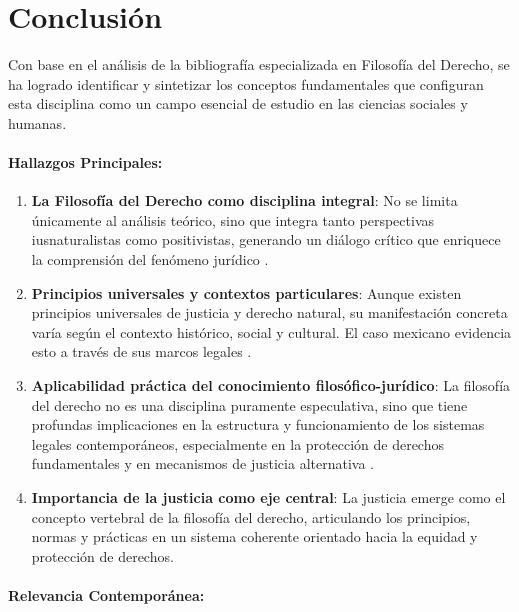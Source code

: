 \documentclass[
	spanish, %
	letterpaper, oneside
]{article}
\begin{document}
\section{Conclusión}

Con base en el análisis de la bibliografía especializada en Filosofía del Derecho, se ha logrado identificar y sintetizar los conceptos fundamentales que configuran esta disciplina como un campo esencial de estudio en las ciencias sociales y humanas.

\paragraph{Hallazgos Principales:}

\begin{enumerate}
	\item \textbf{La Filosofía del Derecho como disciplina integral}: No se limita únicamente al análisis teórico, sino que integra tanto perspectivas iusnaturalistas como positivistas, generando un diálogo crítico que enriquece la comprensión del fenómeno jurídico \cite{finnis_estudios_2017,ruiz_rodriguez_filosofia_derecho_2009,lovon_manual_2020}.
	
	\item \textbf{Principios universales y contextos particulares}: Aunque existen principios universales de justicia y derecho natural, su manifestación concreta varía según el contexto histórico, social y cultural. El caso mexicano evidencia esto a través de sus marcos legales \cite{noauthor_constitucion_nodate,generales_ley_2021,de_victimas_ley_2013}.
	
	\item \textbf{Aplicabilidad práctica del conocimiento filosófico-jurídico}: La filosofía del derecho no es una disciplina puramente especulativa, sino que tiene profundas implicaciones en la estructura y funcionamiento de los sistemas legales contemporáneos, especialmente en la protección de derechos fundamentales y en mecanismos de justicia alternativa \cite{gandara_ley_2015}.
	
	\item \textbf{Importancia de la justicia como eje central}: La justicia emerge como el concepto vertebral de la filosofía del derecho, articulando los principios, normas y prácticas en un sistema coherente orientado hacia la equidad y protección de derechos.
\end{enumerate}

\paragraph{Relevancia Contemporánea:}
\end{document}
